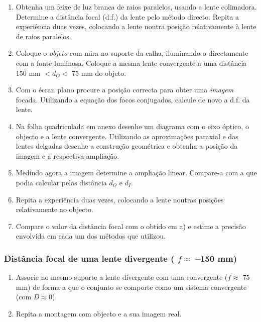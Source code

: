 \documentclass[a4paper,12pt]{article}      %
\begin{document}
\begin{enumerate}
\item Obtenha  um  feixe  de  luz  branca  de  raios  paralelos, usando a lente colimadora.
Determine  a  distância  focal (d.f.)  da  lente pelo método directo.  Repita  a  experiência  duas  vezes,  colocando  a  lente 
noutra posição relativamente à lente de raios paralelos. 
\item Coloque o \emph{objeto} com mira no suporte da calha, iluminando-o directamente com a fonte luminosa. Coloque a mesma lente convergente a uma distância 150 mm $< d_O <$ 75 mm do objeto.

\item Com o écran plano procure a posição correcta para obter uma \emph{imagem} focada.
Utilizando a equação dos focos conjugados, calcule de novo a d.f. da lente. 
\item Na folha quadriculada em anexo desenhe um diagrama com o eixo óptico, o objecto e a lente convergente. Utilizando as aproximações paraxial e das lentes delgadas desenhe a construção geométrica e obtenha a posição da imagem e a respectiva ampliação.

\item Medindo agora a imagem determine a ampliação linear. Compare-a com a que podia  calcular pelas distância $d_O$  e $d_I$. 
\item Repita a experiência duas vezes, colocando a lente noutras posições relativamente ao objecto.  
\item Compare o valor da distância focal com o obtido em a) e estime a precisão envolvida em 
cada um dos métodos que utilizou. 
\end{enumerate}

\subsubsection{\sf   Distância focal de uma lente divergente ( $f  \approx$ --150 mm) }
\begin{enumerate}
\item Associe  no  mesmo  suporte  a  lente  divergente  com  uma  convergente ($f  \approx$ 75 mm) de  forma a  que  o 
conjunto se comporte como um sistema convergente (com $D\approx 0$).
\item Repita a montagem com objecto e a sua imagem real. 


\end{enumerate}
	
\end{document}
